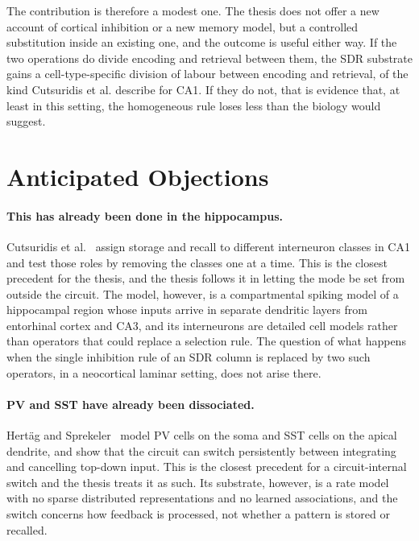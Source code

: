 The contribution is therefore a modest one. The thesis does not offer a new
account of cortical inhibition or a new memory model, but a controlled
substitution inside an existing one, and the outcome is useful either way. If
the two operations do divide encoding and retrieval between them, the SDR
substrate gains a cell-type-specific division of labour between encoding and
retrieval, of the kind Cutsuridis et al. describe for CA1. If they do not, that is evidence that, at least in this setting, the
homogeneous rule loses less than the biology would suggest.

\section{Anticipated Objections}
\label{sec:gap-objections}

\paragraph{This has already been done in the hippocampus.}
Cutsuridis et al.~\cite{cutsuridis2010encoding} assign storage and recall to
different interneuron classes in CA1 and test those roles by removing the
classes one at a time. This is the closest precedent for the thesis, and the
thesis follows it in letting the mode be set from outside the circuit. The
model, however, is a compartmental spiking model of a hippocampal region whose
inputs arrive in separate dendritic layers from entorhinal cortex and CA3, and
its interneurons are detailed cell models rather than operators that could
replace a selection rule. The question of what happens when the single
inhibition rule of an SDR column is replaced by two such operators, in a
neocortical laminar setting, does not arise there.

\paragraph{PV and SST have already been dissociated.}
Hertäg and Sprekeler~\cite{hertag2019amplifying} model PV cells on the soma and
SST cells on the apical dendrite, and show that the circuit can switch
persistently between integrating and cancelling top-down input. This is the
closest precedent for a circuit-internal switch and the thesis treats it as
such. Its substrate, however, is a rate model with no sparse distributed
representations and no learned associations, and the switch concerns how
feedback is processed, not whether a pattern is stored or recalled.

